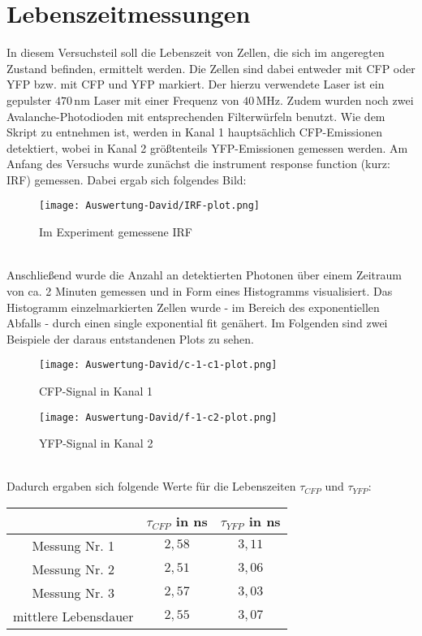 \section{Lebenszeitmessungen}
In diesem Versuchsteil soll die Lebenszeit von Zellen, die sich im angeregten Zustand befinden, ermittelt werden. Die Zellen sind dabei entweder mit CFP oder YFP bzw. mit CFP und YFP markiert. Der hierzu verwendete Laser ist ein gepulster $470\,$nm Laser mit einer Frequenz von $40\,$MHz. Zudem wurden noch zwei Avalanche-Photodioden mit entsprechenden Filterwürfeln benutzt. Wie dem Skript zu entnehmen ist, werden in Kanal 1 hauptsächlich CFP-Emissionen detektiert, wobei in Kanal 2 größtenteils YFP-Emissionen gemessen werden. Am Anfang des Versuchs wurde zunächst die instrument response function (kurz: IRF) gemessen. Dabei ergab sich folgendes Bild:
\begin{figure}[h]
	\centering
	\texttt{[image: Auswertung-David/IRF-plot.png]}
	\caption{Im Experiment gemessene IRF}
	\label{IRF}
\end{figure}\\
Anschließend wurde die Anzahl an detektierten Photonen über einem Zeitraum von ca. 2 Minuten gemessen und in Form eines Histogramms visualisiert. Das Histogramm einzelmarkierten Zellen wurde - im Bereich des exponentiellen Abfalls - durch einen single exponential fit genähert. Im Folgenden sind zwei Beispiele der daraus entstandenen Plots zu sehen.\\
\begin{figure}[h]
	\begin{minipage}{.4\linewidth} %
		\texttt{[image: Auswertung-David/c-1-c1-plot.png]}
		\caption{CFP-Signal in Kanal 1}
	\end{minipage}
	\hspace{.1\linewidth}%
	\begin{minipage}{.4\linewidth} %
		\texttt{[image: Auswertung-David/f-1-c2-plot.png]}
		\caption{YFP-Signal in Kanal 2}
	\end{minipage}
\end{figure}\\
Dadurch ergaben sich folgende Werte für die Lebenszeiten $\tau_{CFP}$ und $\tau_{YFP}$:\\
\begin{center} 
\begin{tabular}[c]{ccc}
	\hline
	 & $\tau_{CFP}$ in ns & $\tau_{YFP}$ in ns \\
	\hline
	Messung Nr. 1 & $2,58$ & $3,11$ \\
	Messung Nr. 2 & $2,51$ & $3,06$\\
	Messung Nr. 3 & $2,57$ & $3,03$\\
	\hline
	mittlere Lebensdauer & $2,55$ & $3,07$\\
	\hline
\end{tabular}\\
\end{center}
